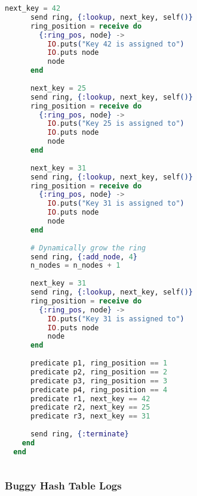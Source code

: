\begin{lstlisting}[language=Elixir, xleftmargin=.1\linewidth]
      next_key = 42
      send ring, {:lookup, next_key, self()}
      ring_position = receive do
        {:ring_pos, node} ->
          IO.puts("Key 42 is assigned to")
          IO.puts node
          node
      end
  
      next_key = 25
      send ring, {:lookup, next_key, self()}
      ring_position = receive do
        {:ring_pos, node} ->
          IO.puts("Key 25 is assigned to")
          IO.puts node
          node
      end
  
      next_key = 31
      send ring, {:lookup, next_key, self()}
      ring_position = receive do
        {:ring_pos, node} ->
          IO.puts("Key 31 is assigned to")
          IO.puts node
          node
      end
  
      # Dynamically grow the ring
      send ring, {:add_node, 4}
      n_nodes = n_nodes + 1
  
      next_key = 31
      send ring, {:lookup, next_key, self()}
      ring_position = receive do
        {:ring_pos, node} ->
          IO.puts("Key 31 is assigned to")
          IO.puts node
          node
      end
  
      predicate p1, ring_position == 1
      predicate p2, ring_position == 2
      predicate p3, ring_position == 3
      predicate p4, ring_position == 4
      predicate r1, next_key == 42
      predicate r2, next_key == 25
      predicate r3, next_key == 31
  
      send ring, {:terminate}
    end
  end
  
\end{lstlisting}
  
\subsubsection{Buggy Hash Table Logs}

